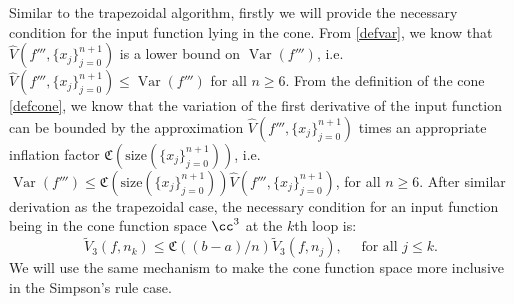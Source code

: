 \documentclass{iitthesis}
\DeclareMathOperator{\Var}{Var}
\theoremstyle{definition}
\theoremstyle{remark}
\begin{document}
Similar to the trapezoidal algorithm, firstly we will provide the necessary condition for the input function lying in the cone. From \eqref{defvar}, we know that $\widehat{V}({f'''},\{x_j\}_{j=0}^{n+1})$ is a lower bound on $\Var({f'''})$, i.e. $\widehat{V}({f'''},\{x_j\}_{j=0}^{n+1})\leq \Var({f'''})$ for all $n \ge 6$. From the definition of the cone \eqref{defcone}, we know that the variation of the first derivative of the input function can be bounded by the approximation $\widehat{V}({f'''},\{x_j\}_{j=0}^{n+1})$ times an appropriate inflation factor $\mathfrak{C}(\text{size}(\{x_j\}_{j=0}^{n+1}))$, i.e. $\Var({f'''})\leq \mathfrak{C}(\text{size}(\{x_j\}_{j=0}^{n+1}))\widehat{V}({f'''},\{x_j\}_{j=0}^{n+1})$, for all $n \ge 6$. After similar derivation as the trapezoidal case, the necessary condition for an input function being in the cone function space $\cc^3$ at the $k$th loop is:
\begin{equation}\label{necconsim}
    \widetilde{V}_3(f,n_k)\leq\mathfrak{C}((b-a)/n)\widetilde{V}_3(f,n_j), \quad \text{ for all } j \leq k.
\end{equation}
We will use the same mechanism to make the cone function space more inclusive in the Simpson's rule case.
\end{document}
